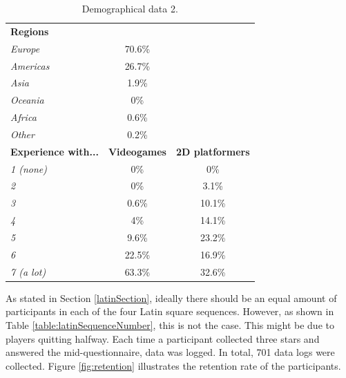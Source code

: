 \begin{table} \centering
\small
\caption{Demographical data 2.}
\label{table:demographics2}
\begin{tabular}{lcc}
\toprule
\textbf{Regions}                      &                & \textbf{}               \\ 
\textit{Europe}                      & 70.6\%         &                         \\
\textit{Americas}                    & 26.7\%         &                         \\
\textit{Asia}                        & 1.9\%          &                         \\
\textit{Oceania}                     & 0\%            &                         \\
\textit{Africa}                      & 0.6\%          &                         \\
\textit{Other}                       & 0.2\%          &                         \\
\textbf{Experience with...} & \textbf{Videogames} & \textbf{2D platformers} \\
\textit{1 (none)}                           & 0\%            & 0\%                     \\
\textit{2}                           & 0\%            & 3.1\%                   \\ 
\textit{3}                           & 0.6\%          & 10.1\%                  \\
\textit{4}                           & 4\%            & 14.1\%                  \\ 
\textit{5}                           & 9.6\%          & 23.2\%                  \\ 
\textit{6}                           & 22.5\%         & 16.9\%                  \\
\textit{7 (a lot)}                           & 63.3\%         & 32.6\%                  \\
\bottomrule
\end{tabular}
\end{table}

As stated in Section \ref{latinSection}, ideally there should be an equal amount of participants in each of the four Latin square sequences. However, as shown in Table \ref{table:latinSequenceNumber}, this is not the case. This might be due to players quitting halfway. Each time a participant collected three stars and answered the mid-questionnaire, data was logged. In total, 701 data logs were collected. Figure \ref{fig:retention} illustrates the retention rate of the participants.

